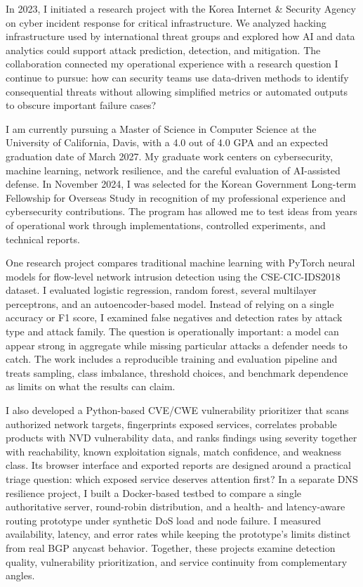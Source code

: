\documentclass[12pt]{article}
\begin{document}
In 2023, I initiated a research project with the Korea Internet \& Security Agency on cyber incident response for critical infrastructure. We analyzed hacking infrastructure used by international threat groups and explored how AI and data analytics could support attack prediction, detection, and mitigation. The collaboration connected my operational experience with a research question I continue to pursue: how can security teams use data-driven methods to identify consequential threats without allowing simplified metrics or automated outputs to obscure important failure cases?

\newpage

I am currently pursuing a Master of Science in Computer Science at the University of California, Davis, with a 4.0 out of 4.0 GPA and an expected graduation date of March 2027. My graduate work centers on cybersecurity, machine learning, network resilience, and the careful evaluation of AI-assisted defense. In November 2024, I was selected for the Korean Government Long-term Fellowship for Overseas Study in recognition of my professional experience and cybersecurity contributions. The program has allowed me to test ideas from years of operational work through implementations, controlled experiments, and technical reports.

One research project compares traditional machine learning with PyTorch neural models for flow-level network intrusion detection using the CSE-CIC-IDS2018 dataset. I evaluated logistic regression, random forest, several multilayer perceptrons, and an autoencoder-based model. Instead of relying on a single accuracy or F1 score, I examined false negatives and detection rates by attack type and attack family. The question is operationally important: a model can appear strong in aggregate while missing particular attacks a defender needs to catch. The work includes a reproducible training and evaluation pipeline and treats sampling, class imbalance, threshold choices, and benchmark dependence as limits on what the results can claim.

I also developed a Python-based CVE/CWE vulnerability prioritizer that scans authorized network targets, fingerprints exposed services, correlates probable products with NVD vulnerability data, and ranks findings using severity together with reachability, known exploitation signals, match confidence, and weakness class. Its browser interface and exported reports are designed around a practical triage question: which exposed service deserves attention first? In a separate DNS resilience project, I built a Docker-based testbed to compare a single authoritative server, round-robin distribution, and a health- and latency-aware routing prototype under synthetic DoS load and node failure. I measured availability, latency, and error rates while keeping the prototype's limits distinct from real BGP anycast behavior. Together, these projects examine detection quality, vulnerability prioritization, and service continuity from complementary angles.
\end{document}
